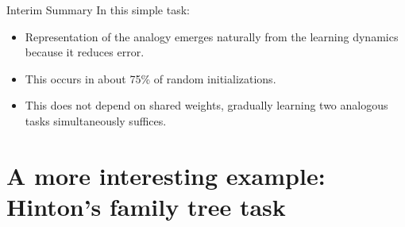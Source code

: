 \documentclass{beamer}
\begin{document}
\begin{frame}{Interim Summary}
 In this simple task:
\begin{itemize}
    \item<2-> Representation of the analogy emerges naturally from the learning dynamics because it reduces error.
    \item<3-> This occurs in about 75\% of random initializations.
    \item<4-> This does not depend on shared weights, gradually learning two analogous tasks simultaneously suffices.
\end{itemize}
\end{frame}

\section{A more interesting example: Hinton's family tree task}
\end{document}
